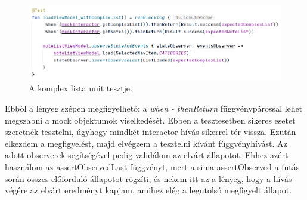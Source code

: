 \begin{figure}[!ht]
	\centering
	\includegraphics[width=150mm, keepaspectratio]{figures/test_case.png}
	\caption{A komplex lista unit tesztje.}
	\label{fig:TestCase}
\end{figure}

Ebből a lényeg szépen megfigyelhető: a \emph{when - thenReturn} függvénypárossal lehet megszabni a mock objektumok viselkedését. Ebben a tesztesetben sikeres esetet szeretnék tesztelni, úgyhogy mindkét interactor hívás sikerrel tér vissza. Ezután elkezdem a megfigyelést, majd elvégzem a tesztelni kívánt függvényhívást. Az adott observerek segítségével pedig validálom az elvárt állapotot. Ehhez azért használom az assertObservedLast függvényt, mert a sima assertObserved a futás során összes előforduló állapotot rögzíti, és nekem itt az a lényeg, hogy a hívás végére az elvárt eredményt kapjam, amihez elég a legutolsó megfigyelt állapot.